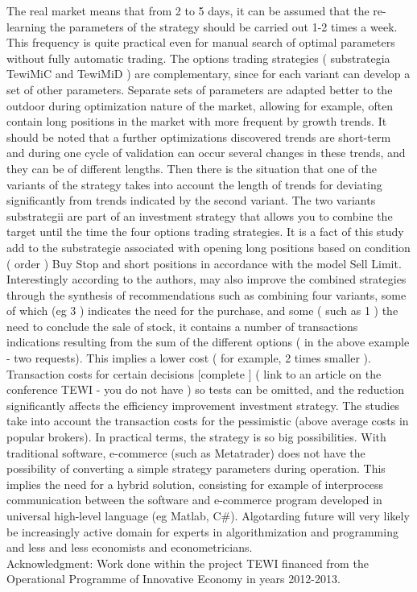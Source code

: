\documentclass{tewiart}
\begin{document}
The real market means that from 2 to 5 days, it can be assumed that the re- learning the parameters of the strategy should be carried out 1-2 times a week. This frequency is quite practical even for manual search of optimal parameters without fully automatic trading. The options trading strategies ( substrategia TewiMiC and TewiMiD ) are complementary, since for each variant can develop a set of other parameters. Separate sets of parameters are adapted better to the outdoor during optimization nature of the market, allowing for example, often contain long positions in the market with more frequent by growth trends. It should be noted that a further optimizations discovered trends are short-term and during one cycle of validation can occur several changes in these trends, and they can be of different lengths. Then there is the situation that one of the variants of the strategy takes into account the length of trends for deviating significantly from trends indicated by the second variant. The two variants substrategii are part of an investment strategy that allows you to combine the target until the time the four options trading strategies. It is a fact of this study add to the substrategie associated with opening long positions based on condition ( order ) Buy Stop and short positions in accordance with the model Sell Limit. Interestingly according to the authors, may also improve the combined strategies through the synthesis of recommendations such as combining four variants, some of which (eg 3 ) indicates the need for the purchase, and some ( such as 1 ) the need to conclude the sale of stock, it contains a number of transactions indications resulting from the sum of the different options ( in the above example - two requests). This implies a lower cost ( for example, 2 times smaller ). Transaction costs for certain decisions [complete ] ( link to an article on the conference TEWI - you do not have ) so tests can be omitted, and the reduction significantly affects the efficiency improvement investment strategy. The studies take into account the transaction costs for the pessimistic (above average costs in popular brokers). In practical terms, the strategy is so big possibilities. With traditional software, e-commerce (such as Metatrader) does not have the possibility of converting a simple strategy parameters during operation. This implies the need for a hybrid solution, consisting for example of interprocess communication between the software and e-commerce program developed in universal high-level language (eg Matlab, C\#). Algotarding future will very likely be increasingly active domain for experts in algorithmization and programming and less and less economists and econometricians.\\

\noindent Acknowledgment: Work done within the project TEWI financed from the Operational Programme of Innovative Economy in years 2012-2013.
 


\end{document}
